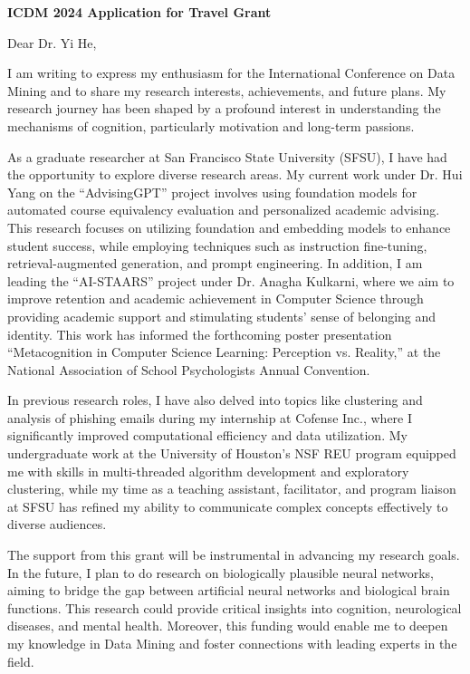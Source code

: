 \documentclass[letterpaper, 10pt]{letter}
\begin{document}
\begin{letter}{\textbf{ICDM 2024 Application for Travel Grant}}
    \opening{Dear Dr. Yi He,}

    I am writing to express my enthusiasm for the International Conference on Data Mining and to share my research interests, achievements,
    and future plans.  My research journey has been shaped by a profound interest in understanding the mechanisms of cognition, particularly
    motivation and long-term passions.

    As a graduate researcher at San Francisco State University (SFSU), I have had the opportunity to explore diverse research areas. My current
    work under Dr. Hui Yang on the ``AdvisingGPT'' project involves using foundation models for automated course equivalency evaluation and
    personalized academic advising. This research focuses on utilizing foundation and embedding models to enhance student success, while
    employing techniques such as instruction fine-tuning, retrieval-augmented generation, and prompt engineering. In addition, I am leading
    the ``AI-STAARS'' project under Dr. Anagha Kulkarni, where we aim to improve retention and academic achievement in Computer Science through
    providing academic support and stimulating students' sense of belonging and identity.  This work has informed the forthcoming
    poster presentation ``Metacognition in Computer Science Learning: Perception vs. Reality,'' at the National Association of School
    Psychologists Annual Convention.

    In previous research roles, I have also delved into topics like clustering and analysis of phishing emails during my internship at
    Cofense Inc., where I significantly improved computational efficiency and data utilization. My undergraduate work at the University of
    Houston's NSF REU program equipped me with skills in multi-threaded algorithm development and exploratory clustering, while my time as a
    teaching assistant, facilitator, and program liaison at SFSU has refined my ability to communicate complex concepts effectively to
    diverse audiences.

    The support from this grant will be instrumental in advancing my research goals. In the future, I plan to do research on biologically
    plausible neural networks, aiming to bridge the gap between artificial neural networks and biological brain functions. This research
    could provide critical insights into cognition, neurological diseases, and mental health.  Moreover, this funding would enable me to
    deepen my knowledge in Data Mining and foster connections with leading experts in the field.


\end{letter}
\end{document}
